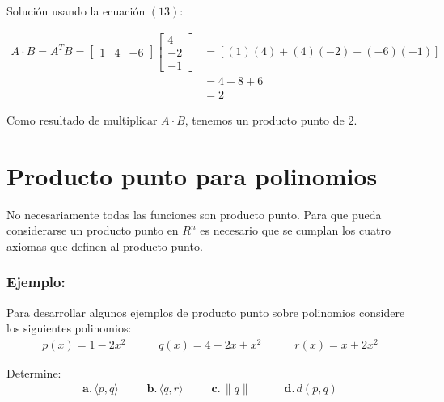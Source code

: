 \documentclass{article}
\begin{document}
    Solución usando la ecuación $(13)$:

    \begin{equation*}
        \begin{aligned}
            A \cdot B = A^TB = \begin{bmatrix}
                1 & 4 & -6
            \end{bmatrix} \begin{bmatrix}
                4 \\
                -2 \\
                -1
            \end{bmatrix}
            &=[(1)(4) + (4)(-2) + (-6)(-1)] \\
            &=4-8+6 \\
            &=2
        \end{aligned}
    \end{equation*}

    Como resultado de multiplicar $A \cdot B$, tenemos un producto punto de $2$.

\section{Producto punto para polinomios}

   No necesariamente todas las funciones son producto punto. Para que pueda considerarse un producto punto en $R^n$ es necesario que se cumplan los cuatro axiomas que definen al producto punto.

   \subsubsection*{Ejemplo:}

    Para desarrollar algunos ejemplos de producto punto sobre polinomios considere los siguientes polinomios:
    \begin{gather*}
        p(x)=1-2x^{2}\hspace{35pt}q(x)=4-2x+x^{2}\hspace{35pt}r(x)=x+2x^{2}
    \end{gather*}

    Determine:
    \begin{gather*}
        \textbf{a.}\hspace{2pt}\langle p,q\rangle\hspace{30pt}\textbf{b.}\hspace{2pt}\langle q,r\rangle\hspace{30pt}\textbf{c.}\hspace{2pt}\parallel q\parallel\hspace{35pt}\textbf{d.}\hspace{2pt}d(p,q)
    \end{gather*}
\end{document}

